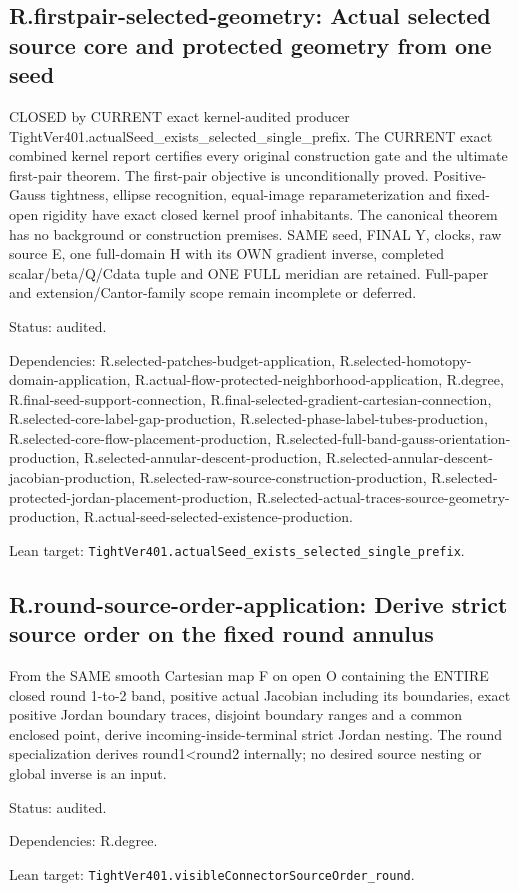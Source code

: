 \documentclass{article}
\begin{document}
\subsection*{R.firstpair-selected-geometry: Actual selected source core and protected geometry from one seed}
CLOSED by CURRENT exact kernel-audited producer TightVer401.actualSeed\_exists\_selected\_single\_prefix. The CURRENT exact combined kernel report certifies every original construction gate and the ultimate first-pair theorem. The first-pair objective is unconditionally proved. Positive-Gauss tightness, ellipse recognition, equal-image reparameterization and fixed-open rigidity have exact closed kernel proof inhabitants. The canonical theorem has no background or construction premises. SAME seed, FINAL Y, clocks, raw source E, one full-domain H with its OWN gradient inverse, completed scalar/beta/Q/Cdata tuple and ONE FULL meridian are retained. Full-paper and extension/Cantor-family scope remain incomplete or deferred.
\par Status: audited.
\par Dependencies: R.selected-patches-budget-application, R.selected-homotopy-domain-application, R.actual-flow-protected-neighborhood-application, R.degree, R.final-seed-support-connection, R.final-selected-gradient-cartesian-connection, R.selected-core-label-gap-production, R.selected-phase-label-tubes-production, R.selected-core-flow-placement-production, R.selected-full-band-gauss-orientation-production, R.selected-annular-descent-production, R.selected-annular-descent-jacobian-production, R.selected-raw-source-construction-production, R.selected-protected-jordan-placement-production, R.selected-actual-traces-source-geometry-production, R.actual-seed-selected-existence-production.
\par Lean target: \texttt{TightVer401.actualSeed\_exists\_selected\_single\_prefix}.
\subsection*{R.round-source-order-application: Derive strict source order on the fixed round annulus}
From the SAME smooth Cartesian map F on open O containing the ENTIRE closed round 1-to-2 band, positive actual Jacobian including its boundaries, exact positive Jordan boundary traces, disjoint boundary ranges and a common enclosed point, derive incoming-inside-terminal strict Jordan nesting. The round specialization derives round1<round2 internally; no desired source nesting or global inverse is an input.
\par Status: audited.
\par Dependencies: R.degree.
\par Lean target: \texttt{TightVer401.visibleConnectorSourceOrder\_round}.
\end{document}
